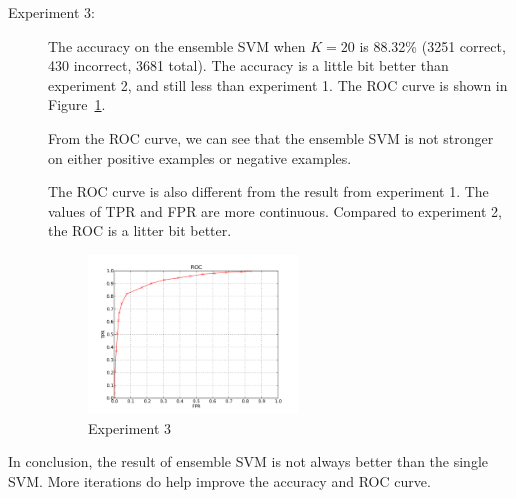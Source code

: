 \documentclass[11pt,letterpaper,oneside]{article}
\begin{document}
\begin{description}
\item[Experiment 3:] The accuracy on the ensemble SVM when $K=20$ is 88.32\% (3251 correct, 430 incorrect, 3681 total). The accuracy is a little bit better than experiment 2, and still less than experiment 1. The ROC curve is shown in Figure~\ref{fig3}.

From the ROC curve, we can see that the ensemble SVM is not stronger on either positive examples or negative examples.

The ROC curve is also different from the result from experiment 1. The values of TPR and FPR are more continuous. Compared to experiment 2, the ROC is a litter bit better.

\begin{figure}
\begin{center}
\includegraphics[width=0.55\textwidth]{fig3}
\caption{Experiment 3}
\label{fig3}
\end{center}
\end{figure}

\end{description}

In conclusion, the result of ensemble SVM is not always better than the single SVM. More iterations do help improve the accuracy and ROC curve.
\end{document}
